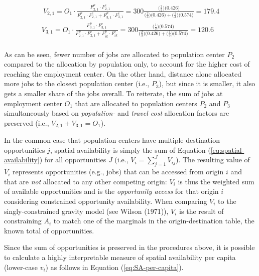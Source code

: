 \documentclass[]{elsarticle} %
\begin{document}
\begin{equation}
\label{eq:SA-2populations}
\begin{array}{l}\
V_{2,1} = O_1\cdot \frac{F^p_{2,1} \cdot F^c_{2,1}}{F^p_{2,1} \cdot F^c_{2,1} + F^p_{3,1} \cdot F^c_{3,1}} = 300 \frac{\big(\frac{2}{3} \big) \big(0.426 \big)}{\big(\frac{2}{3} \big) \big(0.426 \big) + \big(\frac{1}{3} \big) \big(0.574 \big)} = 179.4\\
V_{3,1} = O_1\cdot \frac{F^p_{3,1} \cdot F^c_{3,1}}{F^p_{2,1} \cdot F^c_{2,1} + F^p_{ik} \cdot F^c_{ik}} = 300 \frac{\big(\frac{1}{3} \big) \big(0.574 \big)}{\big(\frac{2}{3} \big) \big(0.426 \big) + \big(\frac{1}{3} \big) \big(0.574 \big)}  =  120.6 \\
\end{array}
\end{equation}

As can be seen, fewer number of jobs are allocated to population center
\(P_2\) compared to the allocation by population only, to account for
the higher cost of reaching the employment center. On the other hand,
distance alone allocated more jobs to the closest population center
(i.e., \(P_3\)), but since it is smaller, it also gets a smaller share
of the jobs overall. To reiterate, the sum of jobs at employment center
\(O_1\) that are allocated to population centers \(P_2\) and \(P_3\)
simultaneously based on \emph{population-} and \emph{travel cost}
allocation factors are preserved (i.e., \(V_{2,1} + V_{3,1} = O_1\)).

In the common case that population centers have multiple destination
opportunities \(j\), spatial availability is simply the sum of Equation
(\ref{eq:spatial-availability}) for all opportunities \(J\) (i.e.,
\(V_i = \sum_{j=1}^J V_{ij}\)). The resulting value of \(V_i\)
represents opportunities (e.g., jobs) that can be accessed from origin
\(i\) and that are \emph{not} allocated to any other competing origin:
\(V_i\) is thus the weighted sum of available opportunities and is the
\emph{opportunity access} for that origin \(i\) considering constrained
opportunity availability. When comparing \(V_i\) to the
singly-constrained gravity model (see Wilson (1971)), \(V_i\) is the
result of constraining \(A_i\) to match one of the marginals in the
origin-destination table, the known total of opportunities.

Since the sum of opportunities is preserved in the procedures above, it
is possible to calculate a highly interpretable measure of spatial
availability per capita (lower-case \(v_i\)) as follows in Equation
(\ref{eq:SA-per-capita}).
\end{document}

